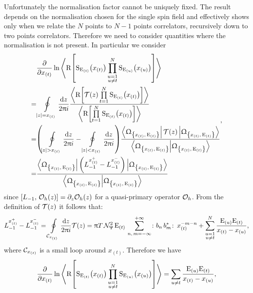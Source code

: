 Unfortunately the normalisation factor cannot be uniquely fixed.
The result depends on the normalisation chosen for the single spin field and effectively shows only when we relate the $N$ points to $N-1$ points correlators, recursively down to two points correlators.
Therefore we need to consider quantities where the normalisation is not present.
In particular we consider
\begin{equation}
  \begin{split}
    & \pdv{x_{(t)}}
    \ln\left\langle
      \rR\qty[%
        \rS_{\rE_{(t)}}\qty(x_{(t)})
        \prod\limits_{\substack{u = 1 \\ u \neq t}}^N \rS_{\rE_{(u)}}\qty(x_{(u)})
      ]
    \right\rangle
    \\
    = &
    \oint\limits_{\abs{z} = x_{(t)}} \ddz
    \frac{
      \left\langle
        \rR\qty[%
          \cT( z )
          \finiteprod{t}{1}{N} \rS_{\rE_{(t)}}\qty(x_{(t)})
        ]
      \right\rangle
    }{
      \left\langle
        \rR\qty[%
          \finiteprod{t}{1}{N} \rS_{\rE_{(t)}}\qty(x_{(t)})
        ]
      \right\rangle
    }
    \\
    = &
    \qty(%
      \oint\limits_{\abs{z} > x_{(t)}} \ddz
      -
      \oint\limits_{\abs{z} < x_{(t)}} \ddz
    )
    \frac{\GGexcvacbra \cT( z ) \GGexcvacket}{\braket{\GGexcvac}}
    \\
    =  &
    \frac{%
      \GGexcvacbra
      \qty(L_{-1}^{x_{(t)}^+} - L_{-1}^{x_{(t)}^-})
      \GGexcvacket
    }{\braket{\GGexcvac}}
  \end{split},
\end{equation}
since $\left[ L_{-1},\, \mathcal{O}_h( z ) \right] = \partial_{z} \mathcal{O}_h( z )$ for a quasi-primary operator $\mathcal{O}_h$.
From the definition of $\mathcal{T}( z )$ it follows that:
\begin{equation}
  L_{-1}^{x_{(t)}^+} - L_{-1}^{x_{(t)}^-}
  =
  \oint\limits_{\mathcal{C}_{x_{(t)}}} \frac{\mathrm{d}z}{2 \uppi i} \mathcal{T}( z )
  =
  \uppi T\, \mathcal{N}_{\Uppsi}^2\, \mathrm{E}_{(t)}\,
  \sum\limits_{n,\, m = -\infty}^{+\infty}
  \colon b_n\, b^*_m \colon\,
  x_{(t)}^{-m-n}
  +
  \sum\limits_{\substack{u = 1 \\ u \neq t}}^N
  \frac{\mathrm{E}_{(u)} \mathrm{E}_{(t)}}{x_{(t)} - x_{(u)}},
\end{equation}
where $\mathcal{C}_{x_{(t)}}$ is a small loop around $x_{(t)}$.
Therefore we have
\begin{equation}
  \pdv{x_{(t)}}
  \ln \left\langle
    \rR\qty[%
      \rS_{\rE_{(t)}}\qty(x_{(t)})
      \prod\limits_{\substack{u = 1 \\ u \neq t}}^N
      \rS_{\rE_{(u)}}\qty(x_{(u)})
    ]
  \right\rangle
  =
  \sum\limits_{u \neq t} \frac{\rE_{(u)} \rE_{(t)}}{x_{(t)} - x_{(u)}},
\end{equation}
